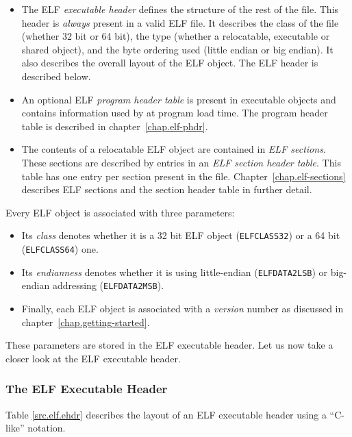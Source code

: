 \documentclass[a4paper,pdftex]{book}
\newcommand{\constant}[1]{\texttt{#1}}
\newcommand{\firstterm}[1]{\textit{#1}}
\begin{document}
\begin{itemize}
\item The ELF \firstterm{executable header}
  defines the structure of the rest of the file.  This header is
  \emph{always} present in a valid ELF file.  It describes the class
  of the file (whether 32 bit or 64 bit), the type (whether a
  relocatable, executable or shared object), and the byte ordering
  used (little endian or big endian).  It also describes the overall
  layout of the ELF object.  The ELF header is described below.

\item An optional ELF \firstterm{program header table}
   is present in executable objects and
  contains information used by at program load
  time.  The program header table is
  described in chapter~\vref{chap.elf-phdr}.

\item The contents of a relocatable ELF object are contained in
  \firstterm{ELF sections}.  These sections are
  described by entries in an \firstterm{ELF section header
    table}. This table has one entry
  per section present in the file.  Chapter~\vref{chap.elf-sections}
  describes ELF sections and the section header table in further
  detail.
\end{itemize}

Every ELF object is associated with three parameters:

\begin{itemize}
\item Its \firstterm{class} denotes
  whether it is a 32 bit ELF object (\constant{ELFCLASS32}) or a 64
  bit (\constant{ELFCLASS64}) one.
\item Its \firstterm{endianness} denotes whether
  it is using little-endian (\constant{ELFDATA2LSB}) or big-endian
  addressing (\constant{ELFDATA2MSB}).
\item Finally, each ELF object is associated with a
  \firstterm{version} number as discussed in
  chapter~\vref{chap.getting-started}.
\end{itemize}

These parameters are stored in the ELF executable header.  Let us now
take a closer look at the ELF executable header.

\subsubsection{The ELF Executable Header}\label{sec.ehdr}
Table \vref{src.elf.ehdr} describes the layout of an ELF executable
header using a ``C-like'' notation.%
\end{document}
